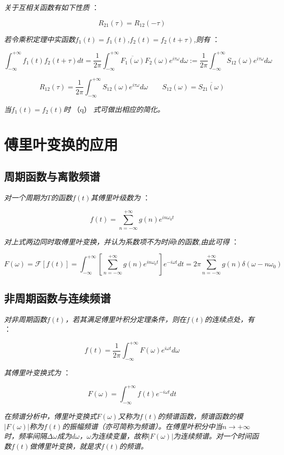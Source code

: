 \textit{关于互相关函数有如下性质 }：

\[R_{21}(\tau)=R_{12}(-\tau)\]

\textit{若令乘积定理中实函数$f_1(t)=f_1(t)$,$f_2(t)=f_2(t+\tau)$,则有 }：

\[\int_{-\infty}^{+\infty}f_1(t)f_2(t+\tau)dt=\frac{1}{2\pi}\int_{-\infty}^{+\infty}\overline{F_1(\omega)}F_2(\omega)e^{i\tau \omega}d\omega :=\frac{1}{2\pi}\int_{-\infty}^{+\infty}S_{12}(\omega)e^{i\tau \omega}d\omega\]

\[R_{12}(\tau)=\frac{1}{2\pi}\int_{-\infty}^{+\infty}S_{12}(\omega)e^{i\tau \omega}d\omega \qquad S_{12}(\omega)=\overline{S_{21}(\omega)} \tag{q}\]

\textit{当$f_1(t)=f_2(t)$时} （q） \textit{式可做出相应的简化。}

\section{傅里叶变换的应用}

\subsection{周期函数与离散频谱}

\textit{对一个周期为$T$的函数$f(t)$其傅里叶级数为 }：

\[f(t)=\sum_{n=-\infty}^{+\infty}g(n)e^{in\omega_0 t} \]

\textit{对上式两边同时取傅里叶变换，并认为系数项不为时间$t$的函数,由此可得 }：

\[F(\omega)=\mathcal{F}[f(t)]=\int_{-\infty}^{+\infty}[\sum_{n=-\infty}^{+\infty}g(n)e^{in\omega_0 t}]e^{-i\omega t}dt=2\pi\sum_{n=-\infty}^{+\infty}g(n)\delta(\omega-n\omega_0) \tag{r}\]

\subsection{非周期函数与连续频谱}

\textit{对非周期函数$f(t)$，若其满足傅里叶积分定理条件，则在$f(t)$的连续点处，有 }：

\[f(t)=\frac{1}{2\pi}\int_{-\infty}^{+\infty}F(\omega)e^{i\omega t}d\omega\]

\textit{其傅里叶变换式为} ：

\[F(\omega)=\int_{-\infty}^{+\infty}f(t)e^{-i\omega t}dt\] 

\textit{在频谱分析中，傅里叶变换式$F(\omega)$又称为$f(t)$的频谱函数，频谱函数的模$|F(\omega)|$称为$f(t)$的振幅频谱（亦可简称为频谱）。在傅里叶积分中当$n\rightarrow +\infty$时，频率间隔$\Delta \omega $成为$d\omega$，$\omega$为连续变量，故称$|F(\omega)|$为连续频谱。对一个时间函数$f(t)$做傅里叶变换，就是求$f(t)$的频谱。}